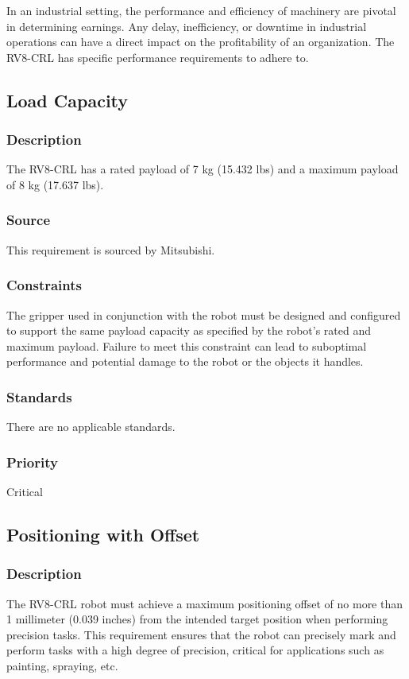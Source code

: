 In an industrial setting, the performance and efficiency of machinery are pivotal in determining earnings. Any delay, inefficiency, or downtime in industrial operations can have a direct impact on the profitability of an organization. The RV8-CRL has specific performance requirements to adhere to.

\subsection{Load Capacity}
\subsubsection{Description}
The RV8-CRL has a rated payload of 7 kg (15.432 lbs) and a maximum payload of 8 kg (17.637 lbs).
\subsubsection{Source}
This requirement is sourced by Mitsubishi.
\subsubsection{Constraints}
The gripper used in conjunction with the robot must be designed and configured to support the same payload capacity as specified by the robot's rated and maximum payload. Failure to meet this constraint can lead to suboptimal performance and potential damage to the robot or the objects it handles.
\subsubsection{Standards}
There are no applicable standards.
\subsubsection{Priority}
Critical

\subsection{Positioning with Offset}
\subsubsection{Description}
The RV8-CRL robot must achieve a maximum positioning offset of no more than 1 millimeter (0.039 inches) from the intended target position when performing precision tasks. This requirement ensures that the robot can precisely mark and perform tasks with a high degree of precision, critical for applications such as painting, spraying, etc.
